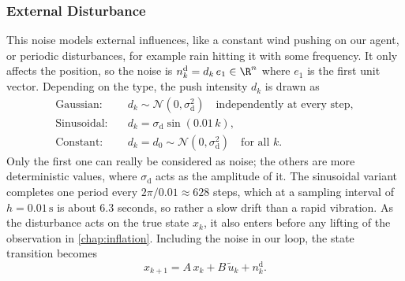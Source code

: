 \subsubsection{External Disturbance}
\label{subsubsec:external-disturbance}

This noise models external influences, like a constant wind pushing on our
agent, or periodic disturbances, for example rain
hitting it with some frequency. It only affects the position, so
the noise is $n^{\mathrm{d}}_k = d_k\, e_1 \in \R^{n}$ where $e_1$ is the first unit vector.
Depending on the type, the push intensity $d_k$ is drawn as
\begin{subequations}
\label{eq:disturbance-noise}
\begin{align}
    \text{Gaussian:} \quad
        & d_k \sim \mathcal{N}\!\left(0, \sigma_{\mathrm{d}}^{2}\right)
          \quad \text{independently at every step}, \label{eq:dist-gauss}\\
    \text{Sinusoidal:} \quad
        & d_k = \sigma_{\mathrm{d}} \sin(0.01\,k) , \label{eq:dist-sin}\\
    \text{Constant:} \quad
        & d_k = d_0 \sim \mathcal{N}\!\left(0, \sigma_{\mathrm{d}}^{2}\right)
          \quad \text{for all } k . \label{eq:dist-const}
\end{align}
\end{subequations}
Only the first one can really be considered as noise; the others are more
deterministic values, where $\sigma_{\mathrm{d}}$ acts as the amplitude of it. 
The sinusoidal variant completes one period every
$2\pi / 0.01 \approx 628$ steps, which at a sampling interval of $h = 0.01\,\mathrm{s}$ 
is about $6.3$ seconds, so rather a slow drift than a rapid vibration.
As the disturbance acts on the true state $x_k$, it also enters before any
lifting of the observation in \cref{chap:inflation}. Including the
noise in our loop, the state transition becomes
\begin{equation}
    \label{eq:disturbance-step}
    x_{k+1} = A\, x_k + B\, \tilde{u}_k + n^{\mathrm{d}}_k .
\end{equation}
